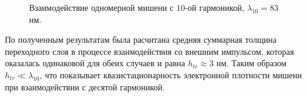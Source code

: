 
    \begin{figure}[htbp]
        \hfil
        \caption{Взаимодействие одномерной мишени с $10$-ой гармоникой, $\lambda_{10} = 83$ нм.}\label{lpic_low_high:image}
    \end{figure}

По полученным результатам была расчитана средняя суммарная толщина переходного слоя в процессе взаимодействия со внешним импульсом, которая оказалась одинаковой для обеих случаев и равна $h_{tr} \approx 3$ нм. Таким образом $h_{tr} \ll \lambda_{10}$, что показывает квазистационарность электронной плотности мишени при взаимодействии с десятой гармоникой.
